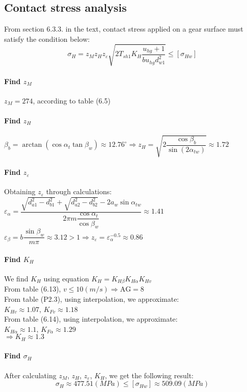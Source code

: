 \subsection{Contact stress analysis}
From section 6.3.3. in the text, contact stress applied on a gear surface must satisfy the condition below:
\[
\sigma_H = z_Mz_Hz_\varepsilon\sqrt{2T_{sh1}K_H\dfrac{u_{hg}+1}{bu_{hg}d_{w1}^2}} \leq [{\sigma}_{Hw}]
\]

\paragraph{Find $ z_M $}
$ z_M = 274 $, according to table (6.5) 
\paragraph{Find $ z_H $}
$ \beta_b = \arctan\left( \cos\alpha_t\tan\beta_w\right) \approx 12.76^\circ \Rightarrow z_H = \sqrt{2\dfrac{\cos\beta_{b}}{\sin(2\alpha_{tw})}} \approx 1.72$
\paragraph{Find $ z_\varepsilon $} Obtaining $ z_\varepsilon $ through calculations:\\
$ \varepsilon_\alpha = \dfrac{\sqrt{d_{a1}^2-d_{b1}^2}+\sqrt{d_{a2}^2-d_{b2}^2}-2a_w\sin\alpha_{tw}}{2\pi m\dfrac{\cos\alpha_t}{\cos\beta_w}} \approx 1.41$\\
$ \varepsilon_\beta = b\dfrac{\sin\beta_w}{m\pi} \approx 3.12>1 \Rightarrow z_\varepsilon = \varepsilon_\alpha^{-0.5} \approx 0.86 $
\paragraph{Find $ K_H $} We find $ K_H $ using equation $ K_H = K_{H\beta}K_{H\alpha}K_{Hv} $\\
From table (6.13), $ v\leq 10 \unit{(m/s)}\Rightarrow \text{AG} = 8 $ \\
From table (P2.3), using interpolation, we approximate:\\ $ K_{Hv} \approx1.07$, $ K_{Fv} \approx1.18$\\
From table (6.14), using interpolation, we approximate:\\ $ K_{H\alpha} \approx1.1$, $ K_{F\alpha} \approx1.29 $ \\	
$ \Rightarrow K_H \approx 1.3 $
\paragraph{Find $ \sigma_H $} After calculating $ z_M $, $ z_H $, $ z_\varepsilon $, $ K_H $, we get the following result:
\[\sigma_H \approx 477.51 \unit{(MPa)}\leq [{\sigma}_{Hw}] \approx 509.09 \unit{(MPa)}\] 

